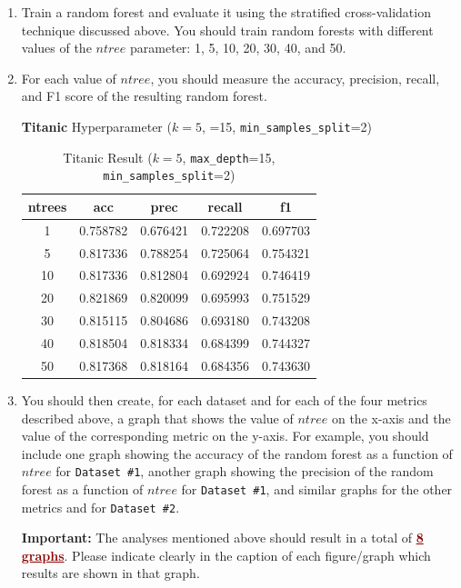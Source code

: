 \documentclass{article}
\begin{document}
\begin{enumerate}
    \item Train a random forest and evaluate it using the stratified cross-validation technique discussed above. You should train random forests with different values of the $ntree$ parameter: 1, 5, 10, 20, 30, 40, and 50.

    \item For each value of $ntree$, you should measure the accuracy, precision, recall, and F1 score of the resulting random forest. 

\noindent \textbf{Titanic} Hyperparameter ($k=5$, =15, \texttt{min\_samples\_split}=2)

\begin{table}[htbp]
\centering
\caption{Titanic Result ($k=5$, \texttt{max\_depth}=15, \texttt{min\_samples\_split}=2)}
\label{tab:titanic_result}
\begin{tabular}{ccccc}
\toprule
ntrees & acc & prec & recall & f1 \\
\midrule
1  & 0.758782 & 0.676421 & 0.722208 & 0.697703 \\
5  & 0.817336 & 0.788254 & 0.725064 & 0.754321 \\
10 & 0.817336 & 0.812804 & 0.692924 & 0.746419 \\
20 & 0.821869 & 0.820099 & 0.695993 & 0.751529 \\
30 & 0.815115 & 0.804686 & 0.693180 & 0.743208 \\
40 & 0.818504 & 0.818334 & 0.684399 & 0.744327 \\
50 & 0.817368 & 0.818164 & 0.684356 & 0.743630 \\
\bottomrule
\end{tabular}
\end{table}


\newpage
    \item You should then create, for each dataset and for each of the four metrics described above, a graph that shows the value of $ntree$ on the x-axis and the value of the corresponding metric on the y-axis. For example, you should include one graph showing the accuracy of the random forest as a function of $ntree$ for \texttt{Dataset \#1}, another graph showing the precision of the random forest as a function of $ntree$ for \texttt{Dataset \#1}, and similar graphs for the other metrics and for \texttt{Dataset \#2}.
    \begin{mybox}[boxpink] 
    \textbf{Important:} The analyses mentioned above should result in a total of \textcolor{darkred}{\ul{\textbf{8 graphs}}}. Please indicate clearly in the caption of each figure/graph which results are shown in that graph.
    \end{mybox}


\end{enumerate}
\end{document}
